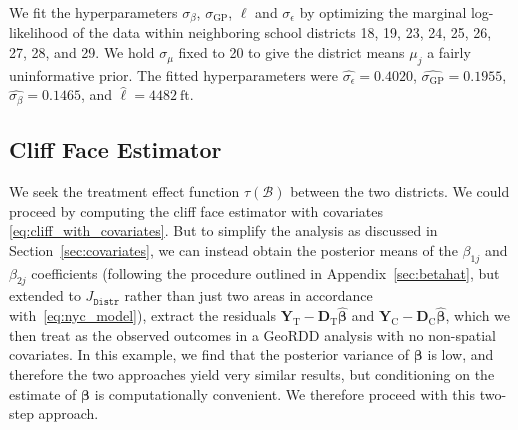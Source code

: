 \documentclass[letter]{article}
\newcommand{\district}{\mathtt{Distr}}
\newcommand{\treat}{\mathrm{T}}
\newcommand{\ctrol}{\mathrm{C}}
\newcommand{\sigmaf}{\sigma_{\mathrm{GP}}}
\newcommand{\sigman}{\sigma_{\epsilon}}
\newcommand{\sigmamu}{\sigma_{\mu}}
\newcommand{\Yvec}{\mathbold{Y}}
\newcommand{\yt}{\Yvec_{\treat}}
\newcommand{\yc}{\Yvec_{\ctrol}}
\newcommand{\betavec}{\mathbold{\beta}}
\newcommand{\border}{\mathcal{B}}
\newcommand{\Dmat}{\mathbold{D}}
\begin{document}
    	We fit the hyperparameters \(\sigma_\beta\), \(\sigmaf\), \(\ell\) and \(\sigman\) by optimizing the marginal log-likelihood of the data within neighboring school districts 18, 19, 23, 24, 25, 26, 27, 28, and 29.
We hold \(\sigmamu\) fixed to 20 to give the district means \(\mu_j\) a fairly uninformative prior.
The fitted hyperparameters were \(\widehat{\sigman}=0.4020\), \(\widehat{\sigmaf}=0.1955\), \(\widehat{\sigma_\beta}=0.1465\), and \(\widehat{\ell}=4482~\text{ft}\).
    


    	\hypertarget{cliff-face-estimator}{%
\subsection{Cliff Face Estimator}\label{cliff-face-estimator}}
    


    	We seek the treatment effect function \(\tau(\border)\) between the two districts.
We could proceed by computing the cliff face estimator with covariates \eqref{eq:cliff_with_covariates}.
But to simplify the analysis as discussed in Section~\ref{sec:covariates}, we can instead obtain the posterior means of the \(\beta_{1j}\) and \(\beta_{2j}\) coefficients (following the procedure outlined in Appendix~\ref{sec:betahat}, but extended to \(J_\district\) rather than just two areas in accordance with~\eqref{eq:nyc_model}), extract the residuals \(\yt{}-\Dmat_\treat{} \hat{\betavec}\) and \(\yc{}-\Dmat_\ctrol{} \hat{\betavec}\), which we then treat as the observed outcomes in a GeoRDD analysis with no non-spatial covariates.
In this example, we find that the posterior variance of \(\betavec\) is low, and therefore the two approaches yield very similar results, but conditioning on the estimate of \(\betavec\) is computationally convenient.
We therefore proceed with this two-step approach.
    
\end{document}
